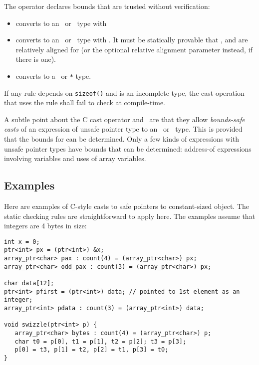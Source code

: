 The operator  declares bounds that are trusted
without verification:
\begin{itemize}
\item
  converts  to an \arrayptr\ or
  \arrayview\ type with 
\item
  converts  to an
  \arrayptr\ or \arrayview\ type with .
  It must be statically provable that ,  and 
  are relatively aligned for  (or the optional
  relative alignment parameter instead, if there is one).
\item
  converts  to a \ptr\ or \texttt{*} type.
\end{itemize}

If any rule depends on \texttt{sizeof()} and  is
an incomplete type, the cast operation that uses the rule shall fail
to check at compile-time.

A subtle point about the C cast operator and \dynamicboundscast\
are that they allow {\em bounds-safe casts} of an expression
 of unsafe pointer type to an \arrayview\ or
\arrayptr\ type. This is provided that the bounds for 
can be determined. Only a few kinds of expressions with unsafe pointer
types have bounds that can be determined: address-of expressions
involving variables and uses of array variables.

\subsection{Examples}
\label{section:pointer-cast-examples}

Here are examples of C-style casts to safe pointers to
constant-sized object. The static checking rules are straightforward
to apply here.  The examples assume that integers are
4 bytes in size:
\begin{verbatim}
int x = 0;
ptr<int> px = (ptr<int>) &x;
array_ptr<char> pax : count(4) = (array_ptr<char>) px;
array_ptr<char> odd_pax : count(3) = (array_ptr<char>) px;

char data[12];
ptr<int> pfirst = (ptr<int>) data; // pointed to 1st element as an integer;
array_ptr<int> pdata : count(3) = (array_ptr<int>) data;

void swizzle(ptr<int> p) {
   array_ptr<char> bytes : count(4) = (array_ptr<char>) p;
   char t0 = p[0], t1 = p[1], t2 = p[2]; t3 = p[3];
   p[0] = t3, p[1] = t2, p[2] = t1, p[3] = t0;
}
\end{verbatim}

